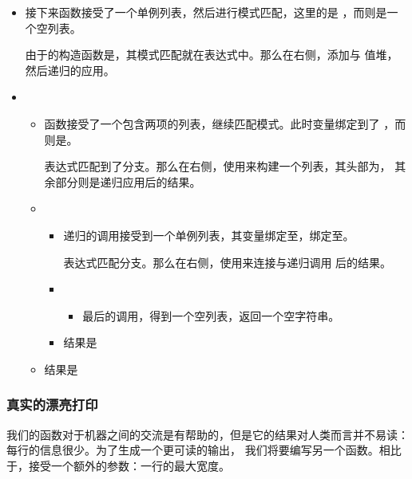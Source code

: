\documentclass[./main.tex]{subfiles}
\begin{document}
\begin{itemize}
  \item 接下来函数接受了一个单例列表，然后进行模式匹配，这里的是
        ，而则是一个空列表。

        由于的构造函数是，其模式匹配就在表达式中。那么在右侧，添加与
        值堆，然后递归的应用。
  \item \begin{itemize}
          \item {}函数接受了一个包含两项的列表，继续匹配模式。此时变量绑定到了
                ，而则是\acode{[Text "oo"]}。

                表达式匹配到了分支。那么在右侧，使用\acode{(:)}来构建一个列表，其头部为，
                其余部分则是递归应用后的结果。
          \item \begin{itemize}
                  \item 递归的调用接受到一个单例列表，其变量绑定至，绑定至\acode{[]}。

                        表达式匹配分支。那么在右侧，使用\acode{(++)}来连接与递归调用
                        后的结果。
                  \item \begin{itemize}
                          \item 最后的调用，得到一个空列表，返回一个空字符串。
                        \end{itemize}
                  \item 结果是
                \end{itemize}
          \item 结果是
        \end{itemize}
\end{itemize}

\subsubsection*{真实的漂亮打印}

我们的函数对于机器之间的交流是有帮助的，但是它的结果对人类而言并不易读：每行的信息很少。为了生成一个更可读的输出，
我们将要编写另一个函数。相比于，接受一个额外的参数：一行的最大宽度。
\end{document}
